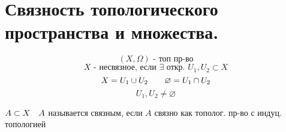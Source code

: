 \documentclass[geometry.tex]{subfiles}
\begin{document}
\section{Связность топологического пространства и множества.}
    
    \begin{Definition}
        \[(X, \Omega) \text{ - топ пр-во}\]
        \[X \text{ - несвязное, если } \exists \text{ откр. } U_1, U_2 \subset X\]
        \[X = U_1 \cup U_2 \qquad \varnothing = U_1 \cap U_2\]
        \[U_1, U_2 \neq \varnothing\]
    \end{Definition}


    \begin{definition}
        $A \subset X \quad A$ называется связным, если $A$ связно как тополог. пр-во с индуц. 
        топологией
    \end{definition}
\end{document}
